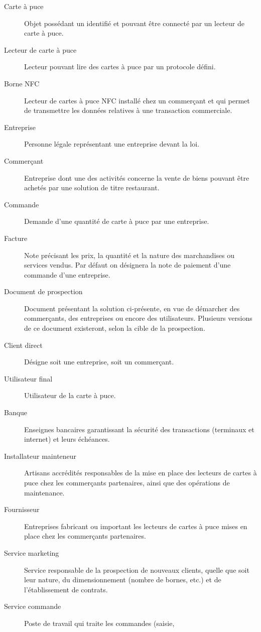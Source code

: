 \begin{description}
  \item[Carte à puce] Objet possédant un identifié et pouvant être connecté par
    un lecteur de carte à puce.
  \item[Lecteur de carte à puce] Lecteur pouvant lire des cartes à puce par un
    protocole défini.
  \item[Borne NFC] Lecteur de cartes à puce NFC installé chez un commerçant et qui
    permet de transmettre les données relatives à une transaction commerciale.
  \item[Entreprise] Personne légale représentant une entreprise devant la loi.
  \item[Commerçant] Entreprise dont une des activités concerne la vente de
    biens pouvant être achetés par une solution de titre restaurant.
  \item[Commande] Demande d'une quantité de carte à puce par une entreprise.
  \item[Facture] Note précisant les prix, la quantité et la nature des
    marchandises ou services vendus. Par défaut on désignera la note de
    paiement d'une commande d'une entreprise.
  \item[Document de prospection] Document présentant la solution ci-présente,
    en vue de démarcher des commerçants, des entreprises ou encore des
    utilisateurs. Plusieurs versions de ce document existeront, selon la cible
    de la prospection.
  \item[Client direct] Désigne soit une entreprise, soit un commerçant.
  \item[Utilisateur final] Utilisateur de la carte à puce.
  \item[Banque] Enseignes bancaires garantissant la sécurité des transactions
    (terminaux et internet) et leurs échéances.
  \item[Installateur mainteneur] Artisans accrédités responsables de la mise en
    place des lecteurs de cartes à puce chez les commerçants partenaires, ainsi
    que des opérations de maintenance.
  \item[Fournisseur] Entreprises fabricant ou important les lecteurs de cartes
    à puce mises en place chez les commerçants partenaires.
  \item[Service marketing] Service responsable de la prospection de nouveaux
    clients, quelle que soit leur nature, du dimensionnement (nombre de bornes,
    etc.) et de l’établissement de contrats.
  \item[Service commande] Poste de travail qui traite les commandes (saisie,

\end{description}
